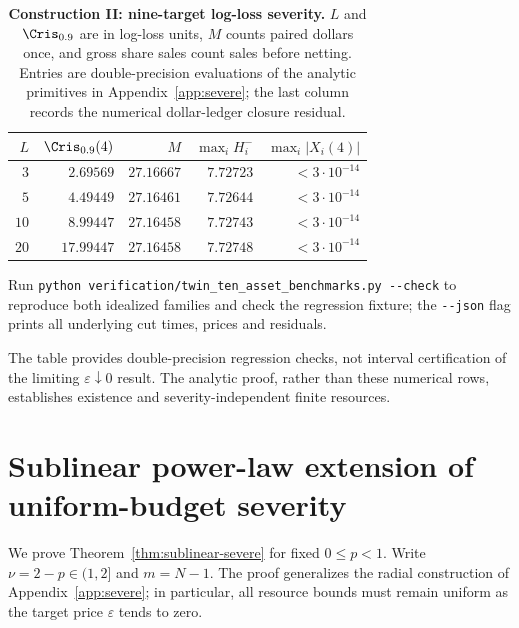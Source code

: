 \documentclass[review,hidelinks,onefignum,onetabnum]{siamonline250211}
\begin{document}
\begin{table}[H]\centering\small
\caption{\textbf{Construction II: nine-target log-loss
severity.} $L$ and $\Cris_{0.9}$ are in log-loss units,
$M$ counts paired dollars once, and gross share sales
count sales before netting. Entries are double-precision
evaluations of the analytic primitives in Appendix~\ref{app:severe};
the last column records the numerical dollar-ledger closure residual.}
\label{tab:twin-severe}
\begin{tabular}{@{}rrrrr@{}}\toprule
$L$ & $\Cris_{0.9}(4)$ & $M$ &
$\max_i H_i^-$ & $\max_i|X_i(4)|$\\\midrule
$3$ & $2.69569$ & $27.16667$ & $7.72723$ & $<3\cdot10^{-14}$\\
$5$ & $4.49449$ & $27.16461$ & $7.72644$ & $<3\cdot10^{-14}$\\
$10$ & $8.99447$ & $27.16458$ & $7.72743$ & $<3\cdot10^{-14}$\\
$20$ & $17.99447$ & $27.16458$ & $7.72748$ & $<3\cdot10^{-14}$\\
\bottomrule\end{tabular}
\end{table}

Run \texttt{python verification/twin\_ten\_asset\_benchmarks.py -{}-check}
to reproduce both idealized families and check the
regression fixture; the \texttt{-{}-json} flag prints
all underlying cut times, prices and residuals.

The table provides double-precision regression checks, not interval certification of the limiting $\varepsilon\downarrow0$ result. The analytic proof, rather than these numerical rows, establishes existence and severity-independent finite resources.




\section{Sublinear power-law extension of uniform-budget severity}\label{app:sublinear-severe}
We prove Theorem~\ref{thm:sublinear-severe} for fixed $0\le p<1$.
Write $\nu=2-p\in(1,2]$ and $m=N-1$. The proof generalizes
the radial construction of Appendix~\ref{app:severe}; in
particular, all resource bounds must remain uniform as the
target price $\varepsilon$ tends to zero.
\end{document}
